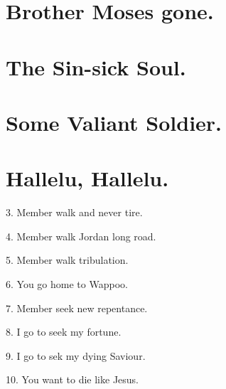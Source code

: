 \documentclass[a5paper,10pt]{book}
\begin{document}
\newpage
\section{Brother Moses gone.}
\thispagestyle{empty}

\begin{song}
\end{song}


\newpage
\section{The Sin-sick Soul.}
\thispagestyle{empty}

\begin{song}
\end{song}


\newpage
\section{Some Valiant Soldier.}
\thispagestyle{empty}

\begin{song}
\end{song}



\newpage
\section{Hallelu, Hallelu.}
\thispagestyle{empty}

\begin{song}
\end{song}

\begin{stanza}
\item[3.]
  Member walk and never tire.
\item[4.]
  Member walk Jordan long road.
\item[5.]
  Member walk tribulation.
\item[6.]
  You go home to Wappoo.
\item[7.]
  Member seek new repentance.
\item[8.]
  I go to seek my fortune.
\item[9.]
  I go to sek my dying Saviour.
\item[10.]
  You want to die like Jesus.
\end{stanza}
\end{document}
